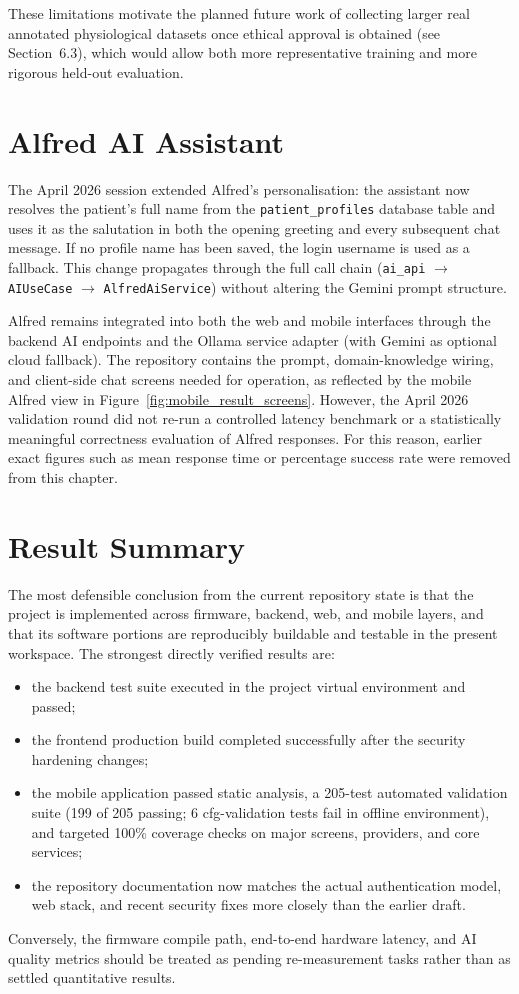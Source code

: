 These limitations motivate the planned future work of collecting larger real
annotated physiological datasets once ethical approval is obtained (see
Section~6.3), which would allow both more representative training and
more rigorous held-out evaluation.

\section{Alfred AI Assistant}

The April 2026 session extended Alfred's personalisation: the assistant now
resolves the patient's full name from the \texttt{patient\_profiles} database
table and uses it as the salutation in both the opening greeting and every
subsequent chat message. If no profile name has been saved, the login username
is used as a fallback. This change propagates through the full call chain
(\texttt{ai\_api} $\to$ \texttt{AIUseCase} $\to$ \texttt{AlfredAiService})
without altering the Gemini prompt structure.

Alfred remains integrated into both the web and mobile interfaces through the backend AI endpoints and the Ollama service adapter (with Gemini as optional cloud fallback). The repository contains the prompt, domain-knowledge wiring, and client-side chat screens needed for operation, as reflected by the mobile Alfred view in Figure~\ref{fig:mobile_result_screens}. However, the April 2026 validation round did not re-run a controlled latency benchmark or a statistically meaningful correctness evaluation of Alfred responses. For this reason, earlier exact figures such as mean response time or percentage success rate were removed from this chapter.

\section{Result Summary}

The most defensible conclusion from the current repository state is that the
project is implemented across firmware, backend, web, and mobile layers, and that
its software portions are reproducibly buildable and testable in the present
workspace. The strongest directly verified results are:

\begin{itemize}
    \item the backend test suite executed in the project virtual environment and passed;
    \item the frontend production build completed successfully after the security hardening changes;
    \item the mobile application passed static analysis, a 205-test automated validation suite (199 of 205 passing; 6 cfg-validation tests fail in offline environment), and targeted 100\% coverage checks on major screens, providers, and core services;
    \item the repository documentation now matches the actual authentication model, web stack, and recent security fixes more closely than the earlier draft.
\end{itemize}

Conversely, the firmware compile path, end-to-end hardware latency, and AI quality metrics should be treated as pending re-measurement tasks rather than as settled quantitative results.
